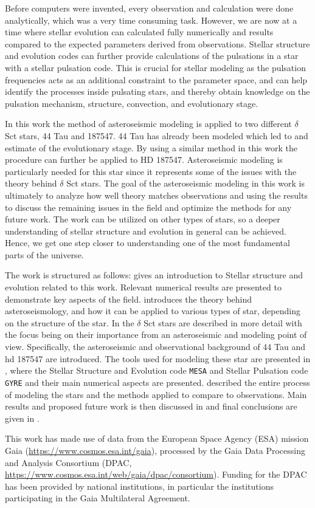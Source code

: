 Before computers were invented, every observation and calculation were done analytically, which was a very time consuming task. However, we are now at a time where stellar evolution can calculated fully numerically and results compared to the expected parameters derived from observations. Stellar structure and evolution codes can further provide calculations of the pulsations in a star with a stellar pulsation code. This is crucial for stellar modeling as the pulsation frequencies acts as an additional constraint to the parameter space, and can help identify the processes inside pulsating stars, and thereby obtain knowledge on the pulsation mechanism, structure, convection, and evolutionary stage. 

In this work the method of asteroseismic modeling is applied to two different $\delta$ Sct stars, 44 Tau and 187547. 44 Tau has already been modeled which led to and estimate of the evolutionary stage. By using a similar method in this work the procedure can further be applied to HD 187547. Asteroseismic modeling is particularly needed for this star since it represents some of the issues with the theory behind $\delta$ Sct stars. The goal of the asteroseismic modeling in this work is ultimately to analyze how well theory matches observations and using the results to discuss the remaining issues in the field and optimize the methods for any future work.  The work can be utilized on other types of stars, so a deeper understanding of stellar structure and evolution in general can be achieved. Hence, we get one step closer to understanding one of the most fundamental parts of the universe. 

 The work is structured as follows:  gives an introduction to Stellar structure and evolution related to  this work. Relevant numerical results are presented to demonstrate key aspects of the field.  introduces the theory behind asteroseismology, and how it can be applied to various types of star, depending on the structure of the star. In  the $\delta$ Sct stars are described in more detail with the focus being on their importance from an asteroseismic and modeling point of view. Specifically, the asteroseismic and observational background of 44 Tau and hd 187547 are introduced. The tools used for modeling these star are presented in , where the Stellar Structure and Evolution code \texttt{MESA} and Stellar Pulsation code \texttt{GYRE} and their main numerical aspects are presented.  described the entire process of modeling the stars and the methods applied to compare to observations. Main results and proposed future work is then discussed in  and final conclusions are given in .

This work has made use of data from the European Space Agency (ESA) mission
Gaia (\url{https://www.cosmos.esa.int/gaia}), processed by the Gaia Data Processing and Analysis Consortium (DPAC,
\url{https://www.cosmos.esa.int/web/gaia/dpac/consortium}). Funding for the DPAC
has been provided by national institutions, in particular the institutions
participating in the Gaia Multilateral Agreement.